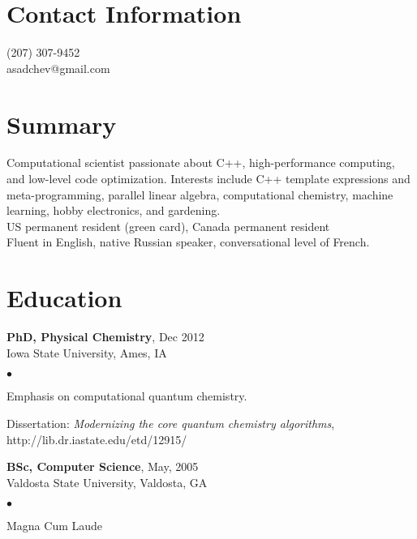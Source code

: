 \documentclass[overlap,line]{cv}
\newenvironment{list2}{
  \begin{list}{$\bullet$}{%
      \setlength{\itemsep}{0in}
      \setlength{\parsep}{0in} \setlength{\parskip}{0in}
      \setlength{\topsep}{0in} \setlength{\partopsep}{0in} 
      \setlength{\leftmargin}{0.2in}}}{\end{list}}
\begin{document}

\begin{resume}
\section{\sc Contact Information}
\vspace{.05in}
(207) 307-9452 \\
asadchev@gmail.com

\section{\sc Summary}
\vspace{.05in}
Computational scientist passionate about C++, high-performance computing, and low-level code optimization.
Interests include C++ template expressions and meta-programming, parallel linear algebra,
computational chemistry, machine learning, hobby electronics, and gardening. \\
US permanent resident (green card), Canada permanent resident \\
Fluent in English, native Russian speaker, conversational level of French.


\section{\sc Education}
\vspace{.05in}
{\bf PhD, Physical Chemistry}, Dec 2012 \\
Iowa State University, Ames, IA
\vspace*{.02in}
\begin{list2}
\item Emphasis on computational quantum chemistry.
\item Dissertation: {\it Modernizing the core quantum chemistry algorithms}, \\
 {http://lib.dr.iastate.edu/etd/12915/}
\end{list2}

{\bf BSc, Computer Science},  May, 2005\\
Valdosta State University, Valdosta, GA
\vspace*{.02in}
\begin{list2}
\item Magna Cum Laude
\end{list2}



\end{resume}
\end{document}

